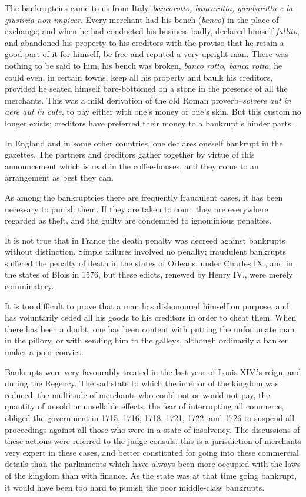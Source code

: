 The bankruptcies came to us from Italy, \textit{bancorotto, bancarotta,
gambarotta e la giustizia non impicar}. Every merchant had his bench
(\textit{banco}) in the place of exchange; and when he had conducted his
business badly, declared himself \textit{fallito}, and abandoned his property
to his creditors with the proviso that he retain a good part of it for
himself, be free and reputed a very upright man. There was nothing to be
said to him, his bench was broken, \textit{banco rotto, banca rotta}; he could
even, in certain towns, keep all his property and baulk his creditors,
provided he seated himself bare-bottomed on a stone in the presence of
all the merchants. This was a mild derivation of the old Roman
proverb--\textit{solvere aut in aere aut in cute}, to pay either with one's
money or one's skin. But this custom no longer exists; creditors have
preferred their money to a bankrupt's hinder parts.

In England and in some other countries, one declares oneself bankrupt in
the gazettes. The partners and creditors gather together by virtue of
this announcement which is read in the coffee-houses, and they come to
an arrangement as best they can.

As among the bankruptcies there are frequently fraudulent cases, it has
been necessary to punish them. If they are taken to court they are
everywhere regarded as theft, and the guilty are condemned to
ignominious penalties.

It is not true that in France the death penalty was decreed against
bankrupts without distinction. Simple failures involved no penalty;
fraudulent bankrupts suffered the penalty of death in the states of
Orleans, under Charles IX., and in the states of Blois in 1576, but
these edicts, renewed by Henry IV., were merely comminatory.

It is too difficult to prove that a man has dishonoured himself on
purpose, and has voluntarily ceded all his goods to his creditors in
order to cheat them. When there has been a doubt, one has been content
with putting the unfortunate man in the pillory, or with sending him to
the galleys, although ordinarily a banker makes a poor convict.

Bankrupts were very favourably treated in the last year of Louis XIV.'s
reign, and during the Regency. The sad state to which the interior of
the kingdom was reduced, the multitude of merchants who could not or
would not pay, the quantity of unsold or unsellable effects, the fear of
interrupting all commerce, obliged the government in 1715, 1716, 1718,
1721, 1722, and 1726 to suspend all proceedings against all those who
were in a state of insolvency. The discussions of these actions were
referred to the judge-consuls; this is a jurisdiction of merchants very
expert in these cases, and better constituted for going into these
commercial details than the parliaments which have always been more
occupied with the laws of the kingdom than with finance. As the state
was at that time going bankrupt, it would have been too hard to punish
the poor middle-class bankrupts.

